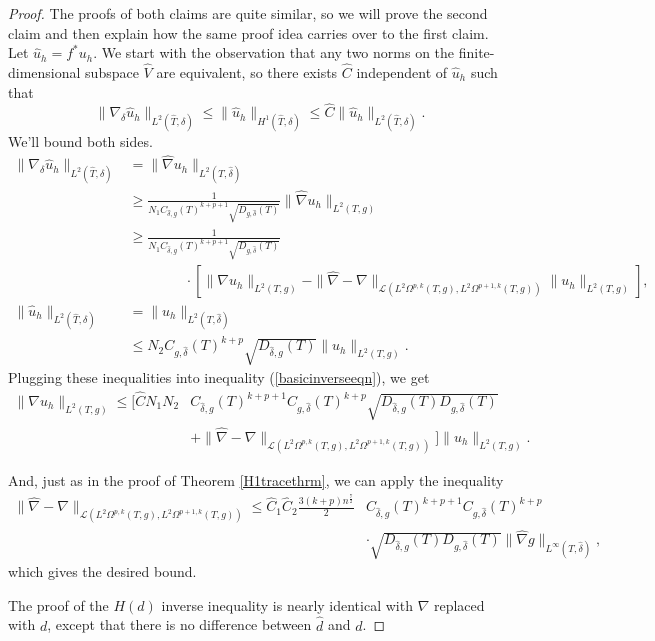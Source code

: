 \documentclass[11pt]{article}
\begin{document}
\begin{proof}
The proofs of both claims are quite similar, so we will prove the second claim and then explain how the same proof idea carries over to the first claim. Let $\hat u_h = f^*u_h$. We start with the observation that any two norms on the finite-dimensional subspace $\hat V$ are equivalent, so there exists $\hat C$ independent of $\hat u_h$ such that 
\begin{equation}\label{basicinverseeqn}\|\nabla_\delta\hat u_h\|_{L^2(\hat T, \delta)} \le \|\hat u_h\|_{H^1(\hat T, \delta)} \le \hat C \|\hat{u}_h\|_{L^2(\hat T, \delta)}.\end{equation}
We'll bound both sides.
\begin{align*}
\|\nabla_\delta\hat u_h\|_{L^2(\hat T, \delta)} &= \|\hat\nabla u_h\|_{L^2(T,\hat \delta)} \\
&\ge \frac{1}{N_1C_{\hat \delta,g}(T)^{k+p + 1}\sqrt{D_{g,\hat \delta}(T)}}\|\hat\nabla u_h\|_{L^2(T,g)}\\
&\ge \frac{1}{N_1C_{\hat \delta,g}(T)^{k+p + 1}\sqrt{D_{g,\hat \delta}(T)}} \\
&\quad\quad\quad\quad\cdot \left[\|\nabla u_h\|_{L^2(T,g)} - \|\hat\nabla - \nabla\|_{\mathcal{L}(L^2\Omega^{p,k}(T,g),L^2\Omega^{p+1,k}(T,g))}\|u_h\|_{L^2(T,g)}\right],
\\
\|\hat u_h\|_{L^2(\hat T, \delta)} &= \|u_h\|_{L^2(T,\hat \delta)}\\
&\le N_2C_{g,\hat \delta}(T)^{k+p}\sqrt{D_{\hat \delta,g}(T)}\|u_h\|_{L^2(T,g)}.
\end{align*}
Plugging these inequalities into inequality (\ref{basicinverseeqn}), we get 
\begin{align*}
\|\nabla u_h\|_{L^2(T,g)} \le \Big[\hat C N_1N_2&C_{\hat \delta,g}(T)^{k+p + 1}C_{g,\hat \delta}(T)^{k+p}\sqrt{D_{\hat \delta,g}(T)D_{g,\hat \delta}(T)} \\
&+ \|\hat\nabla -\nabla\|_{\mathcal{L}(L^2\Omega^{p,k}(T,g),L^2\Omega^{p+1,k}(T,g))}\Big]\|u_h\|_{L^2(T,g)}.
\end{align*}

And, just as in the proof of Theorem \ref{H1tracethrm}, we can apply the inequality
\begin{align*}
\|\hat \nabla - \nabla\|_{\mathcal{L}(L^2\Omega^{p,k}(T,g),L^2\Omega^{p+1,k}(T,g))} \le \hat C_1 \hat C_2 \frac{3(k+p)n^\frac{7}{2}}{2}&C_{\hat \delta,g}(T)^{k+p + 1}C_{g,\hat \delta}(T)^{k+p}\\&\cdot\sqrt{D_{\hat \delta,g}(T)D_{g,\hat \delta}(T)} \|\hat \nabla g\|_{L^\infty(T,\hat \delta)},
\end{align*}
which gives the desired bound.

The proof of the $H(d)$ inverse inequality is nearly identical with $\nabla$ replaced with $d$, except that there is no difference between $\hat d$ and $d$.
\end{proof}
\end{document}

